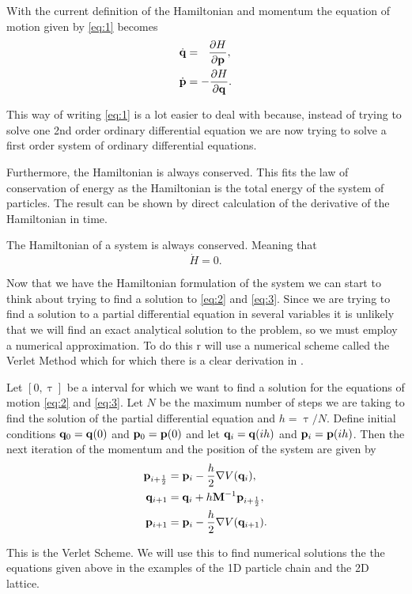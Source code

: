  

With the current definition of the Hamiltonian and momentum the equation of motion given by \eqref{eq:1} becomes \citep{BenLeimkuhler2015}
\begin{align}
\dot{\mathbf{q}} & =  \text{\space\space}\pdv{H}{\mathbf{p}},\label{eq:2}\\
\dot{\mathbf{p}} &  =-\pdv{H}{\mathbf{q}}.\label{eq:3}
\end{align}

This way of writing \eqref{eq:1} is a lot easier to deal with because, instead of trying to solve one 2nd order ordinary differential equation we are now trying to solve a first order system of  ordinary differential equations.

Furthermore, the Hamiltonian is always conserved. This fits the law of conservation of energy as the Hamiltonian is the total energy of the system of particles. The result can be shown by direct calculation of the derivative of the Hamiltonian in time.\\
 \begin{prop}
 The Hamiltonian of a system is always conserved. Meaning that
 $$\dot{H} = 0. $$
 \end{prop}

Now that we have the Hamiltonian formulation of the system we can start to think about trying to find a solution to \eqref{eq:2} and \eqref{eq:3}. Since we are trying to find a solution to a partial differential equation in several variables it is unlikely that we will find an exact analytical solution to the problem, so we must employ a numerical approximation. To do this r will use a numerical scheme called the Verlet Method which for which there is a clear derivation in \citep{BenLeimkuhler2015}.

Let $[0,\uptau]$ be a interval for which we want to find a solution for the equations of motion \eqref{eq:2} and \eqref{eq:3}. Let $N$ be the maximum number of steps we are taking to find the solution of the partial differential equation and $h=\uptau/N$. Define initial conditions $\mathbf{q}_0 = \mathbf{q}(0)$ and $\mathbf{p}_0 = \mathbf{p}(0)$ and let $\mathbf{q}_i = \mathbf{q}(ih)$ and $\mathbf{p}_i=\mathbf{p}(ih)$. Then the next iteration of the momentum and the position of the system are given by
\begin{align*}
\mathbf{p}_{i+\frac{1}{2}} & =  \mathbf{p}_i - \frac{h}{2} \nabla V(\mathbf{q}_i),\\
\mathbf{q}_{i+1} & =  \mathbf{q}_i + h\mathbf{M}^{-1}\mathbf{p}_{i+\frac{1}{2}},\\
\mathbf{p}_{i+1} & =  \mathbf{p}_i - \frac{h }{2}\nabla V(\mathbf{q}_{i+1}).
\end{align*}

This is the Verlet Scheme. We will use this to find numerical solutions the the equations given above in the examples of the 1D particle chain and the 2D lattice.
 
